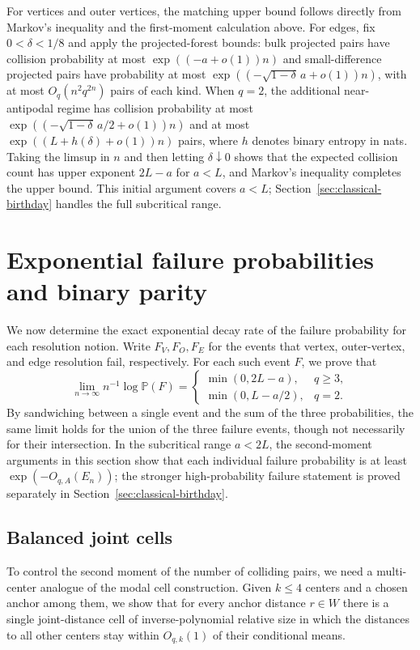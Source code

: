 For vertices and outer vertices, the matching upper bound follows directly from Markov's inequality and the first-moment calculation above. For edges, fix $0<\delta<1/8$ and apply the projected-forest bounds: bulk projected pairs have collision probability at most $\exp((-a+o(1))n)$ and small-difference projected pairs have probability at most $\exp((-\sqrt{1-\delta}\,a+o(1))n)$, with at most $O_q(n^2q^{2n})$ pairs of each kind. When $q=2$, the additional near-antipodal regime has collision probability at most $\exp((-\sqrt{1-\delta}\,a/2+o(1))n)$ and at most $\exp((L+h(\delta)+o(1))n)$ pairs, where $h$ denotes binary entropy in nats. Taking the limsup in $n$ and then letting $\delta\downarrow0$ shows that the expected collision count has upper exponent $2L-a$ for $a<L$, and Markov's inequality completes the upper bound. This initial argument covers $a<L$; Section~\ref{sec:classical-birthday} handles the full subcritical range.

\section{Exponential failure probabilities and binary parity}
We now determine the exact exponential decay rate of the failure probability for each resolution notion. Write $F_V,F_O,F_E$ for the events that vertex, outer-vertex, and edge resolution fail, respectively. For each such event $F$, we prove that
\[
 \lim_{n\to\infty} n^{-1}\log\mathbb P(F)=
 \begin{cases}\min(0,2L-a),&q\ge3,\\ \min(0,L-a/2),&q=2.\end{cases}
\]
By sandwiching between a single event and the sum of the three probabilities, the same limit holds for the union of the three failure events, though not necessarily for their intersection. In the subcritical range $a<2L$, the second-moment arguments in this section show that each individual failure probability is at least $\exp(-O_{q,A}(E_n))$; the stronger high-probability failure statement is proved separately in Section~\ref{sec:classical-birthday}.

\subsection{Balanced joint cells}
To control the second moment of the number of colliding pairs, we need a multi-center analogue of the modal cell construction. Given $k\le4$ centers and a chosen anchor among them, we show that for every anchor distance $r\in W$ there is a single joint-distance cell of inverse-polynomial relative size in which the distances to all other centers stay within $O_{q,k}(1)$ of their conditional means.

